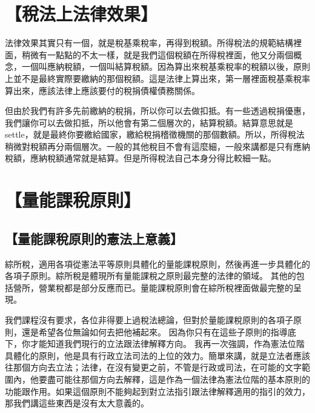 \documentclass[oneside,sub3section]{ctexbook}
\begin{document}
\hypertarget{ux7a05ux6cd5ux4e0aux6cd5ux5f8bux6548ux679c}{%
\section{【稅法上法律效果】}\label{ux7a05ux6cd5ux4e0aux6cd5ux5f8bux6548ux679c}}

法律效果其實只有一個，就是稅基乘稅率，再得到稅額。所得稅法的規範結構裡面，稍微有一點點的不太一樣，就是我們這個稅額在所得稅裡面，他又分兩個概念，一個叫應納稅額，一個叫結算稅額。因為算出來稅基乘稅率的稅額以後，原則上並不是最終實際要繳納的那個稅額。這是法律上算出來，第一層裡面稅基乘稅率算出來，應該法律上應該要付的稅捐債權債務關係。

但由於我們有許多先前繳納的稅捐，所以你可以去做扣抵。有一些透過稅捐優惠，我們讓你可以去做扣抵，所以他會有第二個層次的，結算稅額。結算意思就是settle，就是最終你要繳給國家，繳給稅捐稽徵機關的那個數額。所以，所得稅法稍微對稅額再分兩個層次。一般的其他稅目不會有這麼細，一般來講都是只有應納稅額，應納稅額通常就是結算。但是所得稅法自己本身分得比較細一點。

\hypertarget{ux91cfux80fdux8ab2ux7a05ux539fux5247}{%
\section{【量能課稅原則】}\label{ux91cfux80fdux8ab2ux7a05ux539fux5247}}

\hypertarget{ux91cfux80fdux8ab2ux7a05ux539fux5247ux7684ux61b2ux6cd5ux4e0aux610fux7fa9}{%
\subsection{【量能課稅原則的憲法上意義】}\label{ux91cfux80fdux8ab2ux7a05ux539fux5247ux7684ux61b2ux6cd5ux4e0aux610fux7fa9}}

綜所稅，適用各項從憲法平等原則具體化的量能課稅原則，然後再進一步具體化的各項子原則。綜所稅是體現所有量能課稅之原則最完整的法律的領域。
其他的包括營所，營業稅都是部分反應而已。量能課稅原則會在綜所稅裡面做最完整的呈現。

我們課程沒有要求，各位非得要上過稅法總論，但對於量能課稅原則的各項子原則，還是希望各位無論如何去把他補起來。
因為你只有在這些子原則的指導底下，你才能知道我們現行的立法跟法律解釋方向。
我再一次強調，作為憲法位階具體化的原則，他是具有行政立法司法的上位的效力。簡單來講，就是立法者應該往那個方向去立法；法律，在沒有變更之前，不管是行政或司法，在可能的文字範圍內，他要盡可能往那個方向去解釋，這是作為一個法律為憲法位階的基本原則的功能跟作用。如果這個原則不能夠起到對立法指引跟法律解釋適用的指引的效力，那我們講這些東西是沒有太大意義的。
\end{document}
